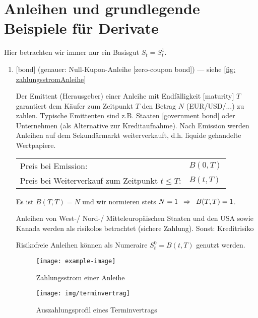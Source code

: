 \section{Anleihen und grundlegende Beispiele für Derivate}

Hier betrachten wir immer nur ein Basisgut $S_t = S_t^1$.

\begin{enumerate}[leftmargin=*, label=(\alph*)]
	\item {} [bond] (genauer: Null-Kupon-Anleihe [zero-coupon bond]) --- siehe \cref{fig: zahlungsstromAnleihe}
	
	Der Emittent (Herausgeber) einer Anleihe mit Endfälligkeit [maturity] $T$ garantiert dem Käufer zum Zeitpunkt $T$ den Betrag $N$ (EUR/USD/...) zu zahlen.
	Typische Emittenten sind z.B. Staaten [government bond] oder Unternehmen (als Alternative zur Kreditaufnahme).
	Nach Emission werden Anleihen auf dem Sekundärmarkt weiterverkauft, d.h. liquide gehandelte Wertpapiere. 
	
	\begin{tabular}{ll}
		Preis bei Emission: & $B(0,T)$ \\
		Preis bei Weiterverkauf zum Zeitpunkt $t \le T$: & $B(t,T)$ \\
	\end{tabular}
	
	Es ist $B(T,T) = N$ und wir normieren stets $N=1 \enskip \Rightarrow \enskip B(T,T)=1$.
	
	Anleihen von West-/ Nord-/ Mitteleuropäischen Staaten und den USA sowie Kanada werden als risikolos betrachtet (sichere Zahlung). Sonst: Kreditrisiko
	
	Risikofreie Anleihen können als Numeraire $S_t^0 = B(t,T)$ genutzt werden.
	
	\begin{figure}
		\centering
		\begin{minipage}[t]{\dimexpr0.45\linewidth-\fboxrule-\fboxsep}
			\centering
			\texttt{[image: example-image]}
			\caption{Zahlungsstrom einer Anleihe}
			\label{fig: zahlungsstromAnleihe}
		\end{minipage}
		\begin{minipage}[t]{\dimexpr0.5\linewidth-\fboxrule-\fboxsep}
			\centering
			\texttt{[image: img/terminvertrag]}
			\caption{Auszahlungsprofil eines Terminvertrags}
			\label{fig: terminvertrag}
		\end{minipage}
	\end{figure}
	

\end{enumerate}
